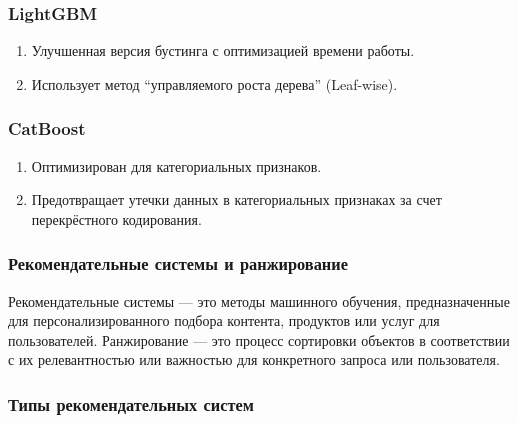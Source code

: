 \begin{enumerate}
\hypertarget{lightgbm}{%
\subsubsection*{LightGBM}\label{lightgbm}}

\begin{enumerate}
\def\labelenumi{\arabic{enumi}.}
\tightlist
\item
  Улучшенная версия бустинга с оптимизацией времени работы.
\item
  Использует метод ``управляемого роста дерева'' (Leaf-wise).
\end{enumerate}

\hypertarget{catboost}{%
\subsubsection*{CatBoost}\label{catboost}}

\begin{enumerate}
\def\labelenumi{\arabic{enumi}.}
\tightlist
\item
  Оптимизирован для категориальных признаков.
\item
  Предотвращает утечки данных в категориальных признаках за счет
  перекрёстного кодирования.
\end{enumerate}

\hypertarget{ux440ux435ux43aux43eux43cux435ux43dux434ux430ux442ux435ux43bux44cux43dux44bux435-ux441ux438ux441ux442ux435ux43cux44b-ux438-ux440ux430ux43dux436ux438ux440ux43eux432ux430ux43dux438ux435}{%
\subsubsection*{Рекомендательные системы и
ранжирование}\label{ux440ux435ux43aux43eux43cux435ux43dux434ux430ux442ux435ux43bux44cux43dux44bux435-ux441ux438ux441ux442ux435ux43cux44b-ux438-ux440ux430ux43dux436ux438ux440ux43eux432ux430ux43dux438ux435}}

Рекомендательные системы --- это методы машинного обучения,
предназначенные для персонализированного подбора контента, продуктов или
услуг для пользователей. Ранжирование --- это процесс сортировки
объектов в соответствии с их релевантностью или важностью для
конкретного запроса или пользователя.

\hypertarget{ux442ux438ux43fux44b-ux440ux435ux43aux43eux43cux435ux43dux434ux430ux442ux435ux43bux44cux43dux44bux445-ux441ux438ux441ux442ux435ux43c}{%
\subsubsection*{Типы рекомендательных
систем}\label{ux442ux438ux43fux44b-ux440ux435ux43aux43eux43cux435ux43dux434ux430ux442ux435ux43bux44cux43dux44bux445-ux441ux438ux441ux442ux435ux43c}}


\end{enumerate}
